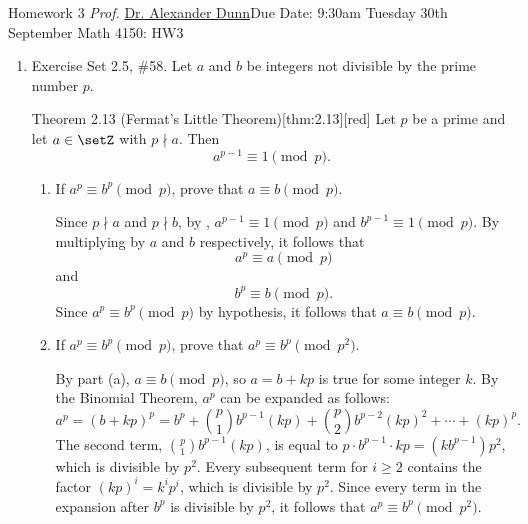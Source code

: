 \newpage{}
{Homework 3}
{\textit{Prof.} \href{https://alexjdunn.weebly.com/}{Dr. Alexander Dunn}}{Due Date: 9:30am Tuesday 30th September}
{Math 4150: HW3}


\newpage


\begin{enumerate}
  \item Exercise Set 2.5, \#58.
  Let $a$ and $b$ be integers not divisible by the prime number $p$.
  \begin{define}{Theorem 2.13 (Fermat's Little Theorem)}[thm:2.13][red]
  Let $p$ be a prime and let $a\in\setZ$ with $p\nmid a$. Then
  \[
  a^{p-1}\equiv 1\pmod{p}.
  \]
  \end{define}
  \begin{enumerate}
    \item If $a^p \equiv b^p \pmod{p}$, prove that $a \equiv b \pmod{p}$. \label{prob:2.5.58a}
    \begin{subprove}
      Since $p \nmid a$ and $p \nmid b$, by , 
      $a^{p-1} \equiv 1 \pmod{p}$ and $b^{p-1} \equiv 1 \pmod{p}$. 
      By multiplying by $a$ and $b$ respectively, it follows that $$a^p \equiv a \pmod{p}$$ and $$b^p \equiv b \pmod{p}.$$
      Since $a^p \equiv b^p \pmod{p}$ by hypothesis, it follows that $a \equiv b \pmod{p}$.
    \end{subprove}
    \item If $a^p \equiv b^p \pmod{p}$, prove that $a^p \equiv b^p \pmod{p^2}$.
    \begin{subprove}
    By part (a), $a \equiv b \pmod{p}$, so $a = b + kp$ is true for some integer $k$. 
    By the Binomial Theorem, $a^p$ can be expanded as follows:
    \[
      a^p = (b + kp)^p = b^p + \binom{p}{1}b^{p-1}(kp) + \binom{p}{2}b^{p-2}(kp)^2 + \cdots + (kp)^p.
    \]
    The second term, $\binom{p}{1}b^{p-1}(kp)$, is equal to $p \cdot b^{p-1} \cdot kp = (kb^{p-1})p^2$, which is divisible by $p^2$. 
    Every subsequent term for $i \ge 2$ contains the factor $(kp)^i = k^i p^i$, which is divisible by $p^2$. 
    Since every term in the expansion after $b^p$ is divisible by $p^2$, it follows that $a^p \equiv b^p \pmod{p^2}$.
    \end{subprove}
  \end{enumerate}


\end{enumerate}
